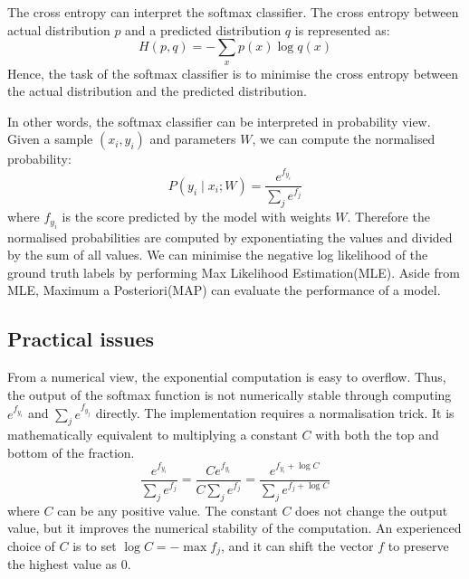 The cross entropy can interpret the softmax classifier. The cross entropy between actual distribution $p$ and a predicted distribution $q$ is represented as:
\begin{equation}\label{eq:CrossEntropyDiff}
H(p,q) = - \sum_x p(x) \log q(x)
\end{equation}
Hence, the task of the softmax classifier is to minimise the cross entropy between the actual distribution and the predicted distribution. 

In other words, the softmax classifier can be interpreted in probability view. Given a sample $(x_i, y_i)$ and parameters $W$, we can compute the normalised probability:
\begin{equation}\label{eq:ProbInter}
P(y_i \mid x_i; W) = \frac{e^{f_{y_i}}}{\sum_j e^{f_j} }
\end{equation}
where $f_{y_i}$ is the score predicted by the model with weights $W$. Therefore the normalised probabilities are computed by exponentiating the values and divided by the sum of all values. We can minimise the negative log likelihood of the ground truth labels by performing Max Likelihood Estimation(MLE). Aside from MLE, Maximum a Posteriori(MAP) can evaluate the performance of a model.

\subsection{Practical issues}

From a numerical view, the exponential computation is easy to overflow. Thus, the output of the softmax function is not numerically stable through computing $e^{f_{y_i}}$ and $\sum_j e^{f_{y_j}}$ directly. The implementation requires a normalisation trick. It is mathematically equivalent to multiplying a constant $C$ with both the top and bottom of the fraction.
\begin{equation}\label{eq:SoftmaxTricks}
\frac{e^{f_{y_i}}}{\sum_j e^{f_j}}
= \frac{Ce^{f_{y_i}}}{C\sum_j e^{f_j}}
= \frac{e^{f_{y_i} + \log C}}{\sum_j e^{f_j + \log C}}
\end{equation}
where $C$ can be any positive value. The constant $C$ does not change the output value, but it improves the numerical stability of the computation. An experienced choice of $C$ is to set $\log C = -\max f_j$, and it can shift the vector $f$ to preserve the highest value as $0$.

